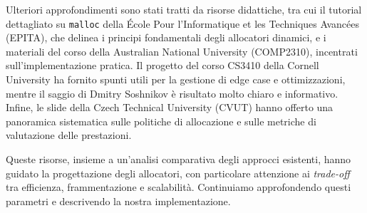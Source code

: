 Ulteriori approfondimenti sono stati tratti da risorse didattiche, tra cui il tutorial dettagliato su \texttt{malloc} della École Pour l'Informatique et les Techniques Avancées (EPITA)\cite{epita-malloc}, che delinea i principi fondamentali degli allocatori dinamici, e i materiali del corso della Australian National University (COMP2310)\cite{anu-malloc}, incentrati sull’implementazione pratica. Il progetto del corso CS3410 della Cornell University\cite{cornell-malloc} ha fornito spunti utili per la gestione di edge case e ottimizzazioni, mentre il saggio di Dmitry Soshnikov\cite{soshnikov-allocator} è risultato molto chiaro e informativo. Infine, le slide della Czech Technical University (CVUT)\cite{cvut-dynamic-mem} hanno offerto una panoramica sistematica sulle politiche di allocazione e sulle metriche di valutazione delle prestazioni.

Queste risorse, insieme a un’analisi comparativa degli approcci esistenti, hanno guidato la progettazione degli allocatori, con particolare attenzione ai \textit{trade-off} tra efficienza, frammentazione e scalabilità. Continuiamo approfondendo questi parametri e descrivendo la nostra implementazione.